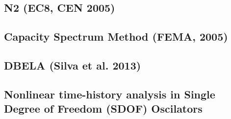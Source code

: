 		\subsection{N2 (EC8, CEN 2005)}
		\label{subsec:N2}
		
	
		\subsection{Capacity Spectrum Method (FEMA, 2005)}
		\label{subsec:CSM}
		
		
		\subsection{DBELA (Silva et al. 2013)}
		\label{subsec:DBELA_Silva}
		
		
		\subsection{Nonlinear time-history analysis in Single Degree of Freedom (SDOF) Oscilators}
		\label{subsec:NLTHA_SDOF}
		